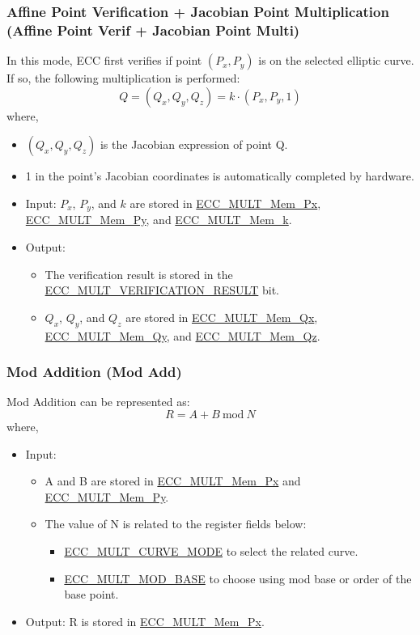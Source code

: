 \documentclass[main\_\_EN.tex]{subfiles}
\begin{document}
\subsubsection{Affine Point Verification + Jacobian Point Multiplication (Affine Point Verif + Jacobian Point Multi)}

In this mode, ECC first verifies if point $(P_x,P_y)$ is on the selected elliptic curve. If so, the following multiplication is performed:
\[
Q = (Q_x,Q_y,Q_z) = k \cdot (P_x,P_y,1)
\]
where,
\begin{itemize}
    \item $(Q_x,Q_y,Q_z)$ is the Jacobian expression of point Q.
    \item 1 in the point's Jacobian coordinates is automatically completed by hardware.
    \item Input: $P_x$, $P_y$, and $k$ are stored in \hyperref[tab:ecc-memory]{ECC\_MULT\_Mem\_Px}, \hyperref[tab:ecc-memory]{ECC\_MULT\_Mem\_Py}, and \hyperref[tab:ecc-memory]{ECC\_MULT\_Mem\_k}.
    \item Output:
    \begin{itemize}
        \item The verification result is stored in the \hyperref[fielddesc:ECCMULTVERIFICATIONRESULT]{ECC\_MULT\_VERIFICATION\_RESULT} bit.
        \item $Q_x$, $Q_y$, and $Q_z$ are stored in \hyperref[tab:ecc-memory]{ECC\_MULT\_Mem\_Qx}, \hyperref[tab:ecc-memory]{ECC\_MULT\_Mem\_Qy}, and \hyperref[tab:ecc-memory]{ECC\_MULT\_Mem\_Qz}.
    \end{itemize}
\end{itemize}

\subsubsection{Mod Addition (Mod Add)}
Mod Addition can be represented as:
\[
R = A + B \ \textrm{mod}\ N
\]
where,
\begin{itemize}
    \item Input:
    \begin{itemize}
        \item A and B are stored in \hyperref[tab:ecc-memory]{ECC\_MULT\_Mem\_Px} and \hyperref[tab:ecc-memory]{ECC\_MULT\_Mem\_Py}.
        \item The value of N is related to the register fields below:
        \begin{itemize}
            \item \hyperref[fielddesc:ECCMULTCURVEMODE]{ECC\_MULT\_CURVE\_MODE} to select the related curve.
            \item \hyperref[fielddesc:ECCMULTMODBASE]{ECC\_MULT\_MOD\_BASE} to choose using mod base or order of the base point.
        \end{itemize}
    \end{itemize}
    \item Output: R is stored in \hyperref[tab:ecc-memory]{ECC\_MULT\_Mem\_Px}.
\end{itemize}
\end{document}
